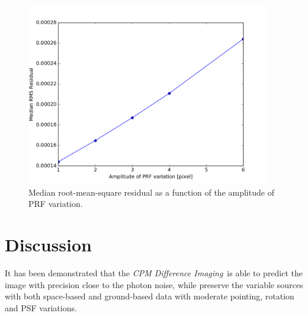 \documentclass[12pt, preprint]{aastex}
\newcommand{\project}[1]{\textsl{#1}}
\newcommand{\cpmdiff}{\project{CPM Difference Imaging}}
\begin{document}
\begin{figure}[p]
\begin{center}
\includegraphics[width=0.95\textwidth]{prf}
\end{center}
\caption{
\label{prf_rms}
 Median root-mean-square residual as a function of the amplitude of PRF variation.
}
\end{figure}

\section{Discussion}
It has been demonstrated that the \cpmdiff\ is able to predict the image with precision close to the photon noise, while preserve the variable sources with both space-based and ground-based data with moderate pointing, rotation and PSF variations. 
\end{document}
